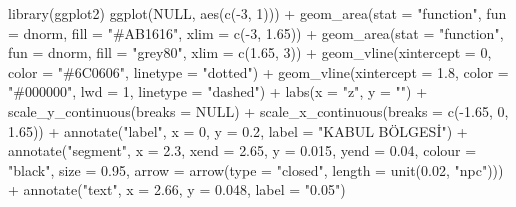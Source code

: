 \documentclass[
  12pt,
]{book}
\newenvironment{Shaded}{\begin{snugshade}}{\end{snugshade}}
\newcommand{\AttributeTok}[1]{\textcolor[rgb]{0.77,0.63,0.00}{#1}}
\newcommand{\ConstantTok}[1]{\textcolor[rgb]{0.00,0.00,0.00}{#1}}
\newcommand{\DecValTok}[1]{\textcolor[rgb]{0.00,0.00,0.81}{#1}}
\newcommand{\FloatTok}[1]{\textcolor[rgb]{0.00,0.00,0.81}{#1}}
\newcommand{\FunctionTok}[1]{\textcolor[rgb]{0.00,0.00,0.00}{#1}}
\newcommand{\NormalTok}[1]{#1}
\newcommand{\SpecialCharTok}[1]{\textcolor[rgb]{0.00,0.00,0.00}{#1}}
\newcommand{\StringTok}[1]{\textcolor[rgb]{0.31,0.60,0.02}{#1}}
\begin{document}
\begin{Shaded}
\begin{Highlighting}[]
\FunctionTok{library}\NormalTok{(ggplot2)}
\FunctionTok{ggplot}\NormalTok{(}\ConstantTok{NULL}\NormalTok{, }\FunctionTok{aes}\NormalTok{(}\FunctionTok{c}\NormalTok{(}\SpecialCharTok{{-}}\DecValTok{3}\NormalTok{, }\DecValTok{1}\NormalTok{))) }\SpecialCharTok{+} \FunctionTok{geom\_area}\NormalTok{(}\AttributeTok{stat =} \StringTok{"function"}\NormalTok{, }\AttributeTok{fun =}\NormalTok{ dnorm, }\AttributeTok{fill =} \StringTok{"\#AB1616"}\NormalTok{, }
    \AttributeTok{xlim =} \FunctionTok{c}\NormalTok{(}\SpecialCharTok{{-}}\DecValTok{3}\NormalTok{, }\FloatTok{1.65}\NormalTok{)) }\SpecialCharTok{+} \FunctionTok{geom\_area}\NormalTok{(}\AttributeTok{stat =} \StringTok{"function"}\NormalTok{, }\AttributeTok{fun =}\NormalTok{ dnorm, }\AttributeTok{fill =} \StringTok{"grey80"}\NormalTok{, }
    \AttributeTok{xlim =} \FunctionTok{c}\NormalTok{(}\FloatTok{1.65}\NormalTok{, }\DecValTok{3}\NormalTok{)) }\SpecialCharTok{+} \FunctionTok{geom\_vline}\NormalTok{(}\AttributeTok{xintercept =} \DecValTok{0}\NormalTok{, }\AttributeTok{color =} \StringTok{"\#6C0606"}\NormalTok{, }\AttributeTok{linetype =} \StringTok{"dotted"}\NormalTok{) }\SpecialCharTok{+} 
    \FunctionTok{geom\_vline}\NormalTok{(}\AttributeTok{xintercept =} \FloatTok{1.8}\NormalTok{, }\AttributeTok{color =} \StringTok{"\#000000"}\NormalTok{, }\AttributeTok{lwd =} \DecValTok{1}\NormalTok{, }\AttributeTok{linetype =} \StringTok{"dashed"}\NormalTok{) }\SpecialCharTok{+} 
    \FunctionTok{labs}\NormalTok{(}\AttributeTok{x =} \StringTok{"z"}\NormalTok{, }\AttributeTok{y =} \StringTok{""}\NormalTok{) }\SpecialCharTok{+} \FunctionTok{scale\_y\_continuous}\NormalTok{(}\AttributeTok{breaks =} \ConstantTok{NULL}\NormalTok{) }\SpecialCharTok{+} \FunctionTok{scale\_x\_continuous}\NormalTok{(}\AttributeTok{breaks =} \FunctionTok{c}\NormalTok{(}\SpecialCharTok{{-}}\FloatTok{1.65}\NormalTok{, }
    \DecValTok{0}\NormalTok{, }\FloatTok{1.65}\NormalTok{)) }\SpecialCharTok{+} \FunctionTok{annotate}\NormalTok{(}\StringTok{"label"}\NormalTok{, }\AttributeTok{x =} \DecValTok{0}\NormalTok{, }\AttributeTok{y =} \FloatTok{0.2}\NormalTok{, }\AttributeTok{label =} \StringTok{"KABUL BÖLGESİ"}\NormalTok{) }\SpecialCharTok{+} \FunctionTok{annotate}\NormalTok{(}\StringTok{"segment"}\NormalTok{, }
    \AttributeTok{x =} \FloatTok{2.3}\NormalTok{, }\AttributeTok{xend =} \FloatTok{2.65}\NormalTok{, }\AttributeTok{y =} \FloatTok{0.015}\NormalTok{, }\AttributeTok{yend =} \FloatTok{0.04}\NormalTok{, }\AttributeTok{colour =} \StringTok{"black"}\NormalTok{, }\AttributeTok{size =} \FloatTok{0.95}\NormalTok{, }
    \AttributeTok{arrow =} \FunctionTok{arrow}\NormalTok{(}\AttributeTok{type =} \StringTok{"closed"}\NormalTok{, }\AttributeTok{length =} \FunctionTok{unit}\NormalTok{(}\FloatTok{0.02}\NormalTok{, }\StringTok{"npc"}\NormalTok{))) }\SpecialCharTok{+} \FunctionTok{annotate}\NormalTok{(}\StringTok{"text"}\NormalTok{, }
    \AttributeTok{x =} \FloatTok{2.66}\NormalTok{, }\AttributeTok{y =} \FloatTok{0.048}\NormalTok{, }\AttributeTok{label =} \StringTok{"0.05"}\NormalTok{)}
\end{Highlighting}
\end{Shaded}
\end{document}
